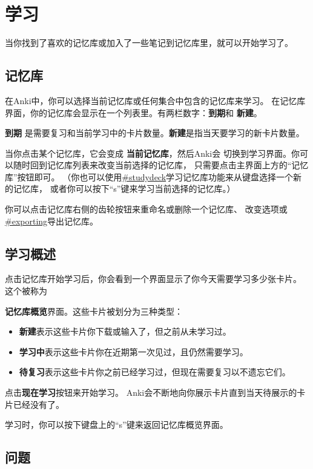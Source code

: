 \documentclass[a4paper]{book}
\begin{document}
	\chapter{学习}\label{}
	
	当你找到了喜欢的记忆库或加入了一些笔记到记忆库里，就可以开始学习了。
	
	\section{记忆库}
	
	在Anki中，你可以选择当前记忆库或任何集合中包含的记忆库来学习。
	在记忆库界面，你的记忆库会显示在一个列表里。有两栏数字：\textbf{到期}和 \textbf{新建}。
	
	\textbf{到期} 是需要复习和当前学习中的卡片数量。\textbf{新建}是指当天要学习的新卡片数量。
	
	当你点击某个记忆库，它会变成 \textbf{当前记忆库}，然后Anki会 切换到学习界面。你可以随时回到记忆库列表来改变当前选择的记忆库， 只需要点击主界面上方的“记忆库”按钮即可。 （你也可以使用\url{#studydeck}学习记忆库功能来从键盘选择一个新的记忆库， 或者你可以按下“s”键来学习当前选择的记忆库。）
	
	你可以点击记忆库右侧的齿轮按钮来重命名或删除一个记忆库、 改变选项或
	\url{#exporting}导出记忆库。
	
	\section{学习概述}
	
	点击记忆库开始学习后，你会看到一个界面显示了你今天需要学习多少张卡片。 这个被称为
	
	\textbf{记忆库概览}界面。这些卡片被划分为三种类型：
	
	\begin{itemize}
		\itemsep1pt\parskip0pt
		\item \textbf{新建}表示这些卡片你下载或输入了，但之前从未学习过。
		\item \textbf{学习中}表示这些卡片你在近期第一次见过，且仍然需要学习。
		\item \textbf{待复习}表示这些卡片你之前已经学习过，但现在需要复习以不遗忘它们。
	\end{itemize}
	
	点击\textbf{现在学习}按钮来开始学习。 Anki会不断地向你展示卡片直到当天待展示的卡片已经没有了。
	
	学习时，你可以按下键盘上的“s”键来返回记忆库概览界面。
	
	\section{问题}
	
\end{document}
